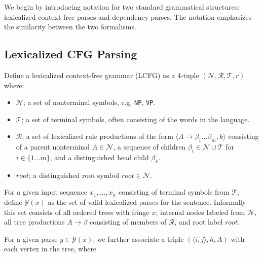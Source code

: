 \documentclass[11pt,letterpaper]{article}
\newcommand{\nonterms}{\mathcal{N}}
\newcommand{\rules}{\mathcal{R}}
\newcommand{\terms}{\mathcal{T}}
\newcommand{\Span}[1]{\langle #1 \rangle}
\newcommand{\Tag}[1]{\texttt{#1}}
\newcommand{\Root}{root}
\begin{document}
We begin by introducing notation for two standard grammatical structures: lexicalized context-free parses and dependency parses. The notation emphasizes the similarity between the two formalisms.

\subsection{Lexicalized CFG Parsing}

Define a lexicalized context-free grammar (LCFG) as a 4-tuple $(\nonterms, \rules, \terms, r)$ where:
\begin{itemize}
\item $\nonterms$; a set of nonterminal symbols, e.g. \Tag{NP}, \Tag{VP}.
\item $\terms$; a set of terminal symbols, often consisting of the words in the language.
\item $\rules$; a set of lexicalized rule productions of the form $\langle A \rightarrow \beta_1 \ldots \beta_m, k\rangle$ consisting of a parent nonterminal $A \in \nonterms$, a sequence of children $\beta_i \in \nonterms \cup \terms$ for $i \in \{1\ldots m\}$, and a distinguished head child $\beta_k$.
\item $\Root$; a distinguished root symbol $\Root \in \nonterms$.
\end{itemize}

For a given input sequence $x_1, \ldots, x_n$ consisting of terminal symbols from $\terms$, define $\mathcal{Y}(x)$ as the set of valid lexicalized parses for the sentence. Informally this set consists of all ordered trees with fringe $x$, internal nodes labeled from $\nonterms$, all tree productions  $A \rightarrow \beta$ consisting of members of $\rules$, and root label $\Root$.



For a given parse $y \in \mathcal{Y}(x)$,
we further associate a triple $(\Span{i, j}, h, A)$ with each vertex in the tree, where
\end{document}
